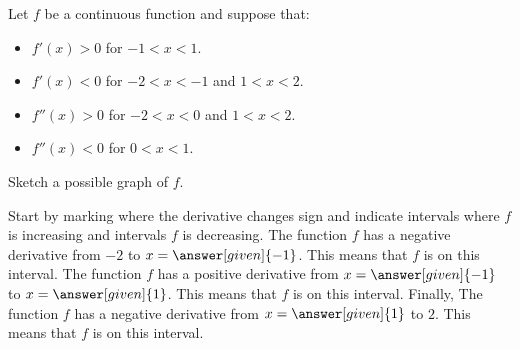 \documentclass{ximera}
\begin{document}
\begin{example}
  Let $f$ be a continuous function and suppose that:
  \begin{itemize}
  \item $f'(x) > 0$ for $-1< x<1$.
  \item $f'(x) < 0$ for $-2< x<-1$ and $1<x<2$.
  \item $f''(x) > 0$ for $-2<x<0$ and $1<x< 2$.
  \item $f''(x) < 0$ for $0<x< 1$.  
  \end{itemize}
  Sketch a possible graph of $f$.
  \begin{explanation}
    Start by marking where the derivative changes sign and indicate
    intervals where $f$ is increasing and intervals $f$ is
    decreasing. The function $f$ has a negative derivative from $-2$
    to $x=\answer[given]{-1}$. This means that $f$ is
     on
    this interval. The function $f$ has a positive derivative from
    $x=\answer[given]{-1}$ to $x=\answer[given]{1}$. This means that
    $f$ is
     on
    this interval. Finally, The function $f$ has a negative derivative
    from $x=\answer[given]{1}$ to $2$. This means that $f$ is
     on
    this interval.
  \begin{image}
\end{image}
\end{explanation}
\end{example}
\end{document}
